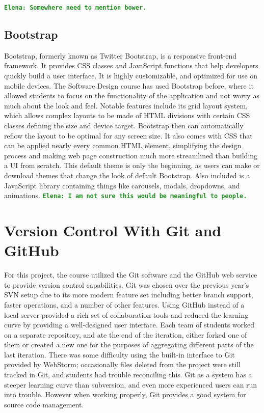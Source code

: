 \documentclass[12pt]{article}
\newcommand{\comment}[1]{{\bf \tt  {#1}}}
\newcommand{\emcomment}[1]{\textcolor{ForestGreen}{\comment{Elena: {#1}}}}
\begin{document}
\emcomment{Somewhere need to mention bower.}

\subsection{Bootstrap}\label{sec:bootstrap}
Bootstrap, formerly known as Twitter Bootstrap, is a responsive front-end framework. It provides CSS classes and JavaScript functions that help developers quickly build a user interface. It is highly customizable, and optimized for use on mobile devices. The Software Design course has used Bootstrap before, where it allowed students to focus on the functionality of the application and not worry as much about the look and feel. Notable features include its grid layout system, which allows complex layouts to be made of HTML divisions with certain CSS classes defining the size and device target. Bootstrap then can automatically reflow the layout to be optimal for any screen size. It also comes with CSS that can be applied nearly every common HTML element, simplifying the design process and making web page construction much more streamlined than building a UI from scratch. This default theme is only the beginning, as users can make or download themes that change the look of default Bootstrap. Also included is a JavaScript library containing things like carousels, modals, dropdowns, and animations. \emcomment{I am not sure this would be meaningful to people.}

\section{Version Control With Git and GitHub}\label{sec:git}
For this project, the course utilized the Git software and the GitHub web service to provide version control capabilities. Git was chosen over the previous year's SVN setup due to its more modern feature set including better branch support, faster operations, and a number of other features. Using GitHub instead of a local server provided a rich set of collaboration tools and reduced the learning curve by providing a well-designed user interface. Each team of students worked on a separate repository, and ate the end of the iteration, either forked one of them or created a new one for the purposes of aggregating different parts of the last iteration. There was some difficulty using the built-in interface to Git provided by WebStorm; occasionally files deleted from the project were still tracked in Git, and students had trouble reconciling this. Git as a system has a steeper learning curve than subversion, and even more experienced users can run into trouble. However when working properly, Git provides a good system for source code management.
\end{document}
